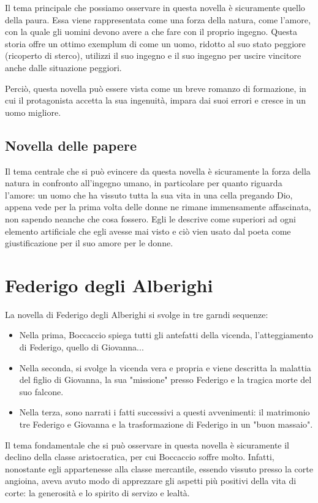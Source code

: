 \documentclass[10pt,a4paper]{article}
\begin{document}
Il tema principale che possiamo osservare in questa novella è sicuramente quello della paura. Essa viene rappresentata come una forza della natura, come l'amore, con la quale gli uomini devono avere a che fare con il proprio ingegno. Questa storia offre un ottimo exemplum di come un uomo, ridotto al suo stato peggiore (ricoperto di sterco), utilizzi il suo ingegno e il suo ingegno per uscire vincitore anche dalle situazione peggiori.

Perciò, questa novella può essere vista come un breve romanzo di formazione, in cui il protagonista accetta la sua ingenuità, impara dai suoi errori e cresce in un uomo migliore.

\subsection{Novella delle papere}

Il tema centrale che si può evincere da questa novella è sicuramente la forza della natura in confronto all'ingegno umano, in particolare per quanto riguarda l'amore: un uomo che ha vissuto tutta la sua vita in una cella pregando Dio, appena vede per la prima volta delle donne ne rimane immensamente affascinata, non sapendo neanche che cosa fossero. Egli le descrive come superiori ad ogni elemento artificiale che egli avesse mai visto e ciò vien usato dal poeta come giustificazione per il suo amore per le donne.

\section{Federigo degli Alberighi}

La novella di Federigo degli Alberighi si svolge in tre garndi sequenze:
\begin{itemize}
	\item Nella prima, Boccaccio spiega tutti gli antefatti della vicenda, l'atteggiamento di Federigo, quello di Giovanna...
	\item Nella seconda, si svolge la vicenda vera e propria e viene descritta la malattia del figlio di Giovanna, la sua "missione" presso Federigo e la tragica morte del suo falcone.
	\item Nella terza, sono narrati i fatti successivi a questi avvenimenti: il matrimonio tre Federigo e Giovanna e la trasformazione di Federigo in un "buon massaio".
\end{itemize}

Il tema fondamentale che si può osservare in questa novella è sicuramente il declino della classe aristocratica, per cui Boccaccio soffre molto. Infatti, nonostante egli appartenesse alla classe mercantile, essendo vissuto presso la corte angioina, aveva avuto modo di apprezzare gli aspetti più positivi della vita di corte: la generosità  e lo spirito di servizo e lealtà.
\end{document}

